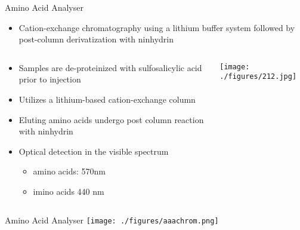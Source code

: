 \documentclass[presentation, smaller]{beamer}
\begin{document}
\begin{frame}[label={sec:orgheadline13}]{Amino Acid Analyser}
\begin{itemize}
\item Cation-exchange chromatography using a lithium buffer system
followed by post-column derivatization with ninhydrin
\end{itemize}




\begin{columns}
\begin{column}{0.5\columnwidth}
\begin{itemize}
\item Samples are de-proteinized with sulfosalicylic acid prior to
injection
\item Utilizes a lithium-based cation-exchange column
\item Eluting amino acids undergo post column reaction with ninhydrin
\item Optical detection in the visible spectrum
\begin{itemize}
\item amino acids: 570nm
\item imino acids 440 nm
\end{itemize}
\end{itemize}
\end{column}

\begin{column}{0.5\columnwidth}
\texttt{[image: ./figures/212.jpg]}
\end{column}
\end{columns}
\end{frame}

\begin{frame}[label={sec:orgheadline14}]{Amino Acid Analyser}
\texttt{[image: ./figures/aaachrom.png]}
\end{frame}
\end{document}
